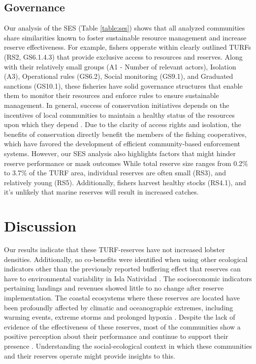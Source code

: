\documentclass{frontiersSCNS}
\theoremstyle{definition}
\theoremstyle{definition}
\theoremstyle{definition}
\theoremstyle{remark}
\begin{document}
\subsection{Governance}\label{governance}

Our analysis of the SES (Table \ref{table:ses}) shows that all analyzed
communities share similarities known to foster sustainable resource
management and increase reserve effectiveness. For example, fishers
opperate within clearly outlined TURFs (RS2, GS6.1.4.3) that provide
exclusive access to resources and reserves. Along with their relatively
small groups (A1 - Number of relevant actors), Isolation (A3),
Operational rules (GS6.2), Social monitoring (GS9.1), and Graduated
sanctions (GS10.1), these fisheries have solid governance structures
that enable them to monitor their resources and enforce rules to ensure
sustainable management. In general, success of conservation initiatives
depends on the incentives of local communities to maintain a healthy
status of the resources upon which they depend \citep{jupiter_2017}. Due
to the clarity of access rights and isolation, the benefits of
conservation directly benefit the members of the fishing cooperatives,
which have favored the development of efficient community-based
enforcement systems. However, our SES analysis also highlights factors
that might hinder reserve performance or mask outcomes While total
reserve size ranges from 0.2\% to 3.7\% of the TURF area, individual
reserves are often small (RS3), and relatively young (RS5).
Additionally, fishers harvest healthy stocks (RS4.1), and it's unlikely
that marine reserves will result in increased catches.

\section{Discussion}\label{discussion}

Our results indicate that these TURF-reserves have not increased lobster
densities. Additionally, no co-benefits were identified when using other
ecological indicators other than the previously reported buffering
effect that reserves can have to environmental variability in Isla
Natividad \citep{micheli_2012-EU}. The socioeconomic indicators
pertaining landings and revenues showed little to no change after
reserve implementation. The coastal ecosystems where these reserves are
located have been profoundly affected by climatic and oceanographic
extremes, including warming events, extreme storms and prolonged hypoxia
\citep{micheli_2012-EU,woodson}. Despite the lack of evidence of the
effectiveness of these reserves, most of the communities show a positive
perception about their performance and continue to support their
presence \citep{ayer_2018}. Understanding the social-ecological context
in which these communities and their reserves operate might provide
insights to this.
\end{document}
